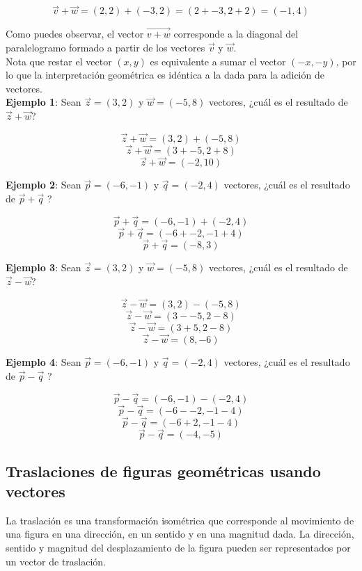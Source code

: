 $$\vec{v}+\vec{w}=(2,2)+(-3,2)=(2+-3,2+2)=(-1,4)$$
\vspace*{.1cm}

\noindent Como puedes observar, el vector $\overrightarrow{v+w}$ corresponde a la diagonal del paralelogramo formado a partir de los vectores $\vec{v}$ y $\vec{w}$.\\

\noindent Nota que restar el vector $(x,y)$ es equivalente a sumar el vector $(-x,-y)$, por lo que la interpretación geométrica es idéntica a la dada para la adición de vectores.\\

\noindent \textbf{Ejemplo 1}: Sean $\vec{z}=(3,2)$  y  $\vec{w}=(-5,8)$ vectores, ¿cuál es el resultado de $\vec{z}+\vec{w}$?

$$\vec{z}+\vec{w}=(3,2)+(-5,8)$$
$$\vec{z}+\vec{w}=(3+-5,2+8)$$
$$\vec{z}+\vec{w}=(-2,10)$$

\vspace*{.1cm}

\noindent \textbf{Ejemplo 2}: Sean $\vec p=(-6,-1)$  y  $\vec q=(-2,4)$ vectores, ¿cuál es el resultado de $\vec{p}+\vec{q}$ ?

$$\vec{p}+\vec{q}=(-6,-1)+(-2,4)$$
$$\vec{p}+\vec{q}=(-6+-2,-1+4)$$
$$\vec{p}+\vec{q}=(-8,3)$$

\vspace*{.1cm}

\noindent \textbf{Ejemplo 3}: Sean $\vec{z}=(3,2)$  y  $\vec{w}=(-5,8)$ vectores, ¿cuál es el resultado de $\vec{z}-\vec{w}$?

$$\vec{z}-\vec{w}=(3,2)-(-5,8)$$
$$\vec{z}-\vec{w}=(3--5,2-8)$$
$$\vec{z}-\vec{w}=(3+5,2-8)$$
$$\vec{z}-\vec{w}=(8,-6)$$

\vspace*{.1cm}

\noindent \textbf{Ejemplo 4}: Sean $\vec p=(-6,-1)$  y  $\vec q=(-2,4)$ vectores, ¿cuál es el resultado de $\vec{p}-\vec{q}$ ?

$$\vec{p}-\vec{q}=(-6,-1)-(-2,4)$$
$$\vec{p}-\vec{q}=(-6--2,-1-4)$$
$$\vec{p}-\vec{q}=(-6+2,-1-4)$$
$$\vec{p}-\vec{q}=(-4,-5)$$


\subsection{Traslaciones de figuras geométricas usando vectores}

La traslación es una transformación isométrica que corresponde al movimiento de una figura en una dirección, en un sentido y en una magnitud dada. La dirección, sentido y magnitud del desplazamiento de la figura pueden ser representados por un vector de traslación.\\

